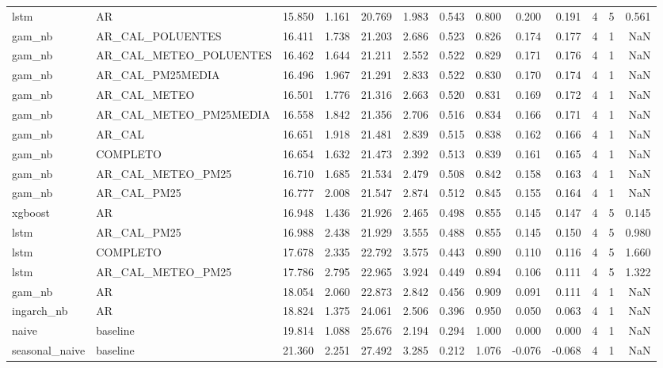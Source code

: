 \begin{tabular}{llrrrrrrrrrrr}
lstm & AR & 15.850 & 1.161 & 20.769 & 1.983 & 0.543 & 0.800 & 0.200 & 0.191 & 4 & 5 & 0.561 \\
gam_nb & AR_CAL_POLUENTES & 16.411 & 1.738 & 21.203 & 2.686 & 0.523 & 0.826 & 0.174 & 0.177 & 4 & 1 & NaN \\
gam_nb & AR_CAL_METEO_POLUENTES & 16.462 & 1.644 & 21.211 & 2.552 & 0.522 & 0.829 & 0.171 & 0.176 & 4 & 1 & NaN \\
gam_nb & AR_CAL_PM25MEDIA & 16.496 & 1.967 & 21.291 & 2.833 & 0.522 & 0.830 & 0.170 & 0.174 & 4 & 1 & NaN \\
gam_nb & AR_CAL_METEO & 16.501 & 1.776 & 21.316 & 2.663 & 0.520 & 0.831 & 0.169 & 0.172 & 4 & 1 & NaN \\
gam_nb & AR_CAL_METEO_PM25MEDIA & 16.558 & 1.842 & 21.356 & 2.706 & 0.516 & 0.834 & 0.166 & 0.171 & 4 & 1 & NaN \\
gam_nb & AR_CAL & 16.651 & 1.918 & 21.481 & 2.839 & 0.515 & 0.838 & 0.162 & 0.166 & 4 & 1 & NaN \\
gam_nb & COMPLETO & 16.654 & 1.632 & 21.473 & 2.392 & 0.513 & 0.839 & 0.161 & 0.165 & 4 & 1 & NaN \\
gam_nb & AR_CAL_METEO_PM25 & 16.710 & 1.685 & 21.534 & 2.479 & 0.508 & 0.842 & 0.158 & 0.163 & 4 & 1 & NaN \\
gam_nb & AR_CAL_PM25 & 16.777 & 2.008 & 21.547 & 2.874 & 0.512 & 0.845 & 0.155 & 0.164 & 4 & 1 & NaN \\
xgboost & AR & 16.948 & 1.436 & 21.926 & 2.465 & 0.498 & 0.855 & 0.145 & 0.147 & 4 & 5 & 0.145 \\
lstm & AR_CAL_PM25 & 16.988 & 2.438 & 21.929 & 3.555 & 0.488 & 0.855 & 0.145 & 0.150 & 4 & 5 & 0.980 \\
lstm & COMPLETO & 17.678 & 2.335 & 22.792 & 3.575 & 0.443 & 0.890 & 0.110 & 0.116 & 4 & 5 & 1.660 \\
lstm & AR_CAL_METEO_PM25 & 17.786 & 2.795 & 22.965 & 3.924 & 0.449 & 0.894 & 0.106 & 0.111 & 4 & 5 & 1.322 \\
gam_nb & AR & 18.054 & 2.060 & 22.873 & 2.842 & 0.456 & 0.909 & 0.091 & 0.111 & 4 & 1 & NaN \\
ingarch_nb & AR & 18.824 & 1.375 & 24.061 & 2.506 & 0.396 & 0.950 & 0.050 & 0.063 & 4 & 1 & NaN \\
naive & baseline & 19.814 & 1.088 & 25.676 & 2.194 & 0.294 & 1.000 & 0.000 & 0.000 & 4 & 1 & NaN \\
seasonal_naive & baseline & 21.360 & 2.251 & 27.492 & 3.285 & 0.212 & 1.076 & -0.076 & -0.068 & 4 & 1 & NaN \\
\bottomrule
\end{tabular}
